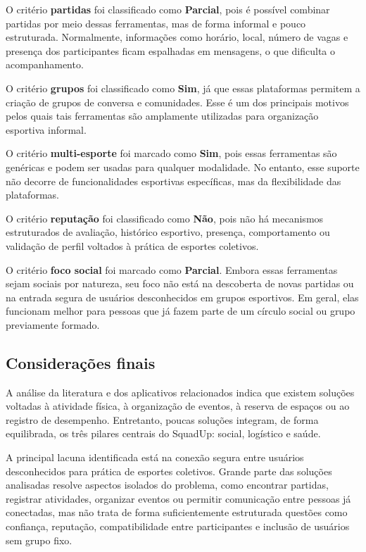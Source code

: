 \documentclass[a4paper, 12pt]{article}
\begin{document}
\begin{justify}
O critério \textbf{partidas} foi classificado como \textbf{Parcial}, pois é possível combinar partidas por meio dessas ferramentas, mas de forma informal e pouco estruturada. Normalmente, informações como horário, local, número de vagas e presença dos participantes ficam espalhadas em mensagens, o que dificulta o acompanhamento.

O critério \textbf{grupos} foi classificado como \textbf{Sim}, já que essas plataformas permitem a criação de grupos de conversa e comunidades. Esse é um dos principais motivos pelos quais tais ferramentas são amplamente utilizadas para organização esportiva informal.

O critério \textbf{multi-esporte} foi marcado como \textbf{Sim}, pois essas ferramentas são genéricas e podem ser usadas para qualquer modalidade. No entanto, esse suporte não decorre de funcionalidades esportivas específicas, mas da flexibilidade das plataformas.

O critério \textbf{reputação} foi classificado como \textbf{Não}, pois não há mecanismos estruturados de avaliação, histórico esportivo, presença, comportamento ou validação de perfil voltados à prática de esportes coletivos.

O critério \textbf{foco social} foi marcado como \textbf{Parcial}. Embora essas ferramentas sejam sociais por natureza, seu foco não está na descoberta de novas partidas ou na entrada segura de usuários desconhecidos em grupos esportivos. Em geral, elas funcionam melhor para pessoas que já fazem parte de um círculo social ou grupo previamente formado.

\subsection{Considerações finais}

A análise da literatura e dos aplicativos relacionados indica que existem soluções voltadas à atividade física, à organização de eventos, à reserva de espaços ou ao registro de desempenho. Entretanto, poucas soluções integram, de forma equilibrada, os três pilares centrais do SquadUp: social, logístico e saúde.

A principal lacuna identificada está na conexão segura entre usuários desconhecidos para prática de esportes coletivos. Grande parte das soluções analisadas resolve aspectos isolados do problema, como encontrar partidas, registrar atividades, organizar eventos ou permitir comunicação entre pessoas já conectadas, mas não trata de forma suficientemente estruturada questões como confiança, reputação, compatibilidade entre participantes e inclusão de usuários sem grupo fixo.


\end{justify}
\end{document}

